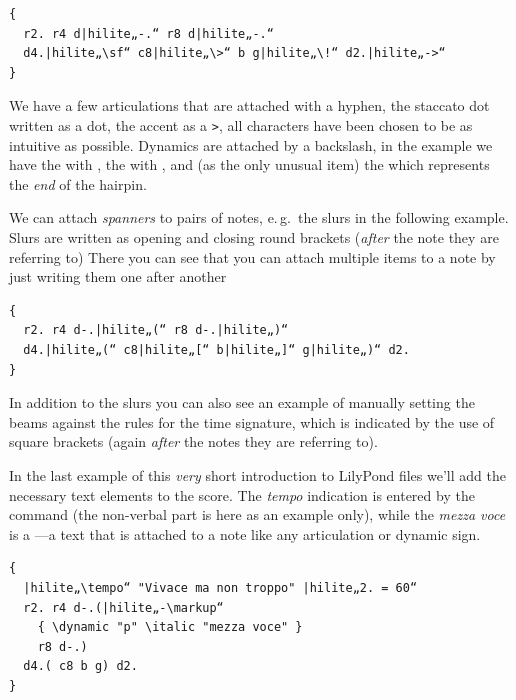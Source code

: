 \documentclass[DIV=12]{scrreprt}
\begin{document}
\begin{multicols}{2}
\begin{Verbatim}[samepage=true,
				   commandchars=|„“]
{
  r2. r4 d|hilite„-.“ r8 d|hilite„-.“ 
  d4.|hilite„\sf“ c8|hilite„\>“ b g|hilite„\!“ d2.|hilite„->“
}
\end{Verbatim}
\columnbreak
{}
\end{multicols}

We have a few articulations that are attached with a hyphen, the staccato dot written as a dot, the accent as a \texttt{>}, all characters have been chosen to be as intuitive as possible.
Dynamics are attached by a backslash, in the example we have the  with , the \decrescHairpin with \cmd{>}, and (as the only unusual item) the \cmd{!} which represents the \emph{end} of the hairpin.

We can attach \emph{spanners} to pairs of notes, e.\,g.\ the slurs in the following example.
Slurs are written as opening and closing round brackets (\emph{after} the note they are referring to)
There you can see that you can attach multiple items to a note by just writing them one after another

\begin{multicols}{2}
\begin{Verbatim}[samepage=true,
				   commandchars=|„“]
{
  r2. r4 d-.|hilite„(“ r8 d-.|hilite„)“
  d4.|hilite„(“ c8|hilite„[“ b|hilite„]“ g|hilite„)“ d2.
}
\end{Verbatim}
\columnbreak
{}
\end{multicols}

In addition to the slurs you can also see an example of manually setting the beams against the rules for the time signature, which is indicated by the use of square brackets (again \emph{after} the notes they are referring to).

In the last example of this \emph{very} short introduction to LilyPond files we'll add the necessary text elements to the score.
The \emph{tempo} indication is entered by the  command (the non-verbal part is here as an example only), while the  \emph{mezza voce} is a ---a text that is attached to a note like any articulation or dynamic sign.

\begin{multicols}{2}
\begin{Verbatim}[samepage=true,
				   commandchars=|„“]
{
  |hilite„\tempo“ "Vivace ma non troppo" |hilite„2. = 60“
  r2. r4 d-.(|hilite„-\markup“
    { \dynamic "p" \italic "mezza voce" } 
    r8 d-.) 
  d4.( c8 b g) d2.
}
\end{Verbatim}
\columnbreak
\vspace*{4.5em}
\end{multicols}
\end{document}

